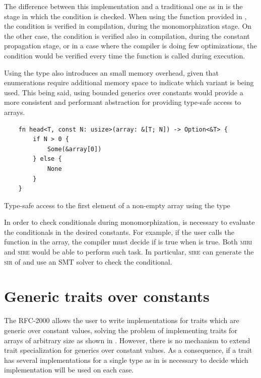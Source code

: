 The difference between this implementation and a traditional one as in
 is the stage in which the condition  is
checked. When using the function provided in ,
the condition is verified in compilation, during the monomorphization stage. On
the other case, the condition is verified also in compilation, during the
constant propagation stage, or in a case where the compiler is doing few
optimizations, the condition would be verified every time the function is
called during execution.

Using the  type also introduces an small memory overhead, given
that enumerations require additional memory space to indicate which variant is
being used. This being said, using bounded generics over constants would
provide a more consistent and performant abstraction for providing type-safe
access to arrays.

\begin{listing}[h]
	\begin{verbatim}
    fn head<T, const N: usize>(array: &[T; N]) -> Option<&T> {
        if N > 0 {
            Some(&array[0])
        } else {
            None
        }
    }
    \end{verbatim}
    \caption{Type-safe access to the first element of a non-empty array using the  type}
  \label{lst:head_no_bounds}
\end{listing}

In order to check conditionals during monomorphization, is necessary to
evaluate the conditionals in the desired constants.  For example, if the user
calls the  function in the \inrust{[1, 2, 3]} array, the compiler
must decide if  is true when  is true.  Both
\textsc{miri} and \textsc{sire} would be able to perform such task. In
particular, \textsc{sire} can generate the \textsc{sir} of  and
use an SMT solver to check the conditional.

\section{Generic traits over constants}

The RFC-2000 allows the user to write implementations for traits which are
generic over constant values, solving the problem of implementing traits for
arrays of arbitrary size as shown in . However,
there is no mechanism to extend trait specialization for generics over constant
values. As a consequence, if a trait has several implementations for a single
type as in  is necessary to decide which
implementation will be used on each case. 

